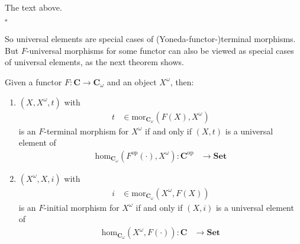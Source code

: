 \begin{prf}
The text above.
\\
\phantom{proven}
\hfill
$\square$
\end{prf}
So universal elements are special cases of (Yoneda-functor-)terminal morphisms.
But $F$-universal morphisms for some functor can also be viewed as special cases of universal elements, as the next theorem shows.
\\
\begin{thm}
\label{thm:unielemequivuni2}
Given a functor $F \colon \mathbf{C} \rightarrow \mathbf{C}_{\omega}$ and an object $X^{\omega}$, then:
\begin{enumerate}
\item[(1T)]
$(X,X^{\omega},t)$ with
\begin{align*}
  t
  &\in
  \mathrm{mor}_{\mathbf{C}_{\omega}}(F(X),X^{\omega})
\end{align*}
is an $F$-terminal morphism for $X^{\omega}$ if and only if $(X,t)$ is a universal element of
\begin{align*}
  \mathrm{hom}_{\mathbf{C}_{\omega}}(F^{\mathrm{op}}(\cdot),X^{\omega})
  \colon
  \mathbf{C}^{\mathrm{op}}
  &\rightarrow
  \mathbf{Set}
\end{align*}
\item[(1I)]
$(X^{\omega},X,i)$ with
\begin{align*}
  i
  &\in
  \mathrm{mor}_{\mathbf{C}_{\omega}}(X^{\omega},F(X))
\end{align*}
is an $F$-initial morphism for $X^{\omega}$ if and only if $(X,i)$ is a universal element of
\begin{align*}
  \mathrm{hom}_{\mathbf{C}_{\omega}}(X^{\omega},F(\cdot))
  \colon
  \mathbf{C}
  &\rightarrow
  \mathbf{Set}
\end{align*}
\end{enumerate}
\end{thm}

